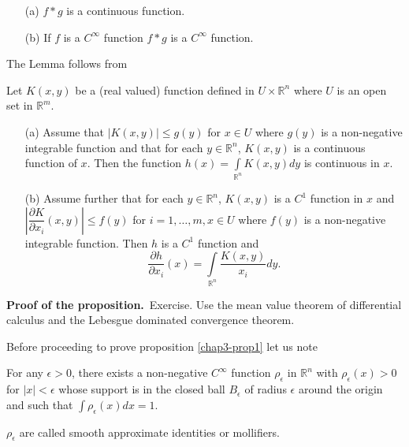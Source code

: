 \begin{lemma}\label{chap3-lem2}
\begin{itemize}
\item[\rm(a)] $f\ast g$ is a continuous function.

\item[\rm(b)] If $f$ is a $C^{\infty}$ function $f\ast g$ is a $C^{\infty}$ function.
\end{itemize}
\end{lemma}

The Lemma follows from

\begin{proposition}\label{chap3-prop2}
Let $K(x,y)$ be a (real valued) function defined in $U\times \mathbb{R}^{n}$ where $U$ is an open set in $\mathbb{R}^{m}$.
\begin{itemize}
\item[\rm(a)] Assume that $|K(x,y)|\leq g(y)$ for $x\in U$ where $g(y)$ is a non-negative integrable function and that for each $y\in \mathbb{R}^{n}$, $K(x,y)$ is a continuous function of $x$. Then the function $h(x)=\int\limits_{\mathbb{R}^{n}}K(x,y)dy$ is continuous in $x$.

\item[\rm(b)] Assume further that for each $y\in \mathbb{R}^{n}$, $K(x,y)$ is a $C^{1}$ function in $x$ and $\left|\dfrac{\partial K}{\partial x_{i}}(x,y)\right|\leq f(y)$ for $i=1,\ldots,m,x\in U$ where $f(y)$ is a non-negative integrable function. Then $h$ is a $C^{1}$ function and
$$
\frac{\partial h}{\partial x_{i}}(x)=\int\limits_{\mathbb{R}^{n}}\frac{K(x,y)}{x_{i}}dy.
$$
\end{itemize}
\end{proposition}

\noindent
{\bf Proof of the proposition.}~Exercise. Use the mean value theorem of differential calculus and the Lebesgue dominated convergence theorem.

Before proceeding to prove proposition \ref{chap3-prop1} let us note

\begin{lemma}\label{chap3-lem3}
For any $\epsilon > 0$, there exists a non-negative $C^{\infty}$ function $\rho_{\epsilon}$ in $\mathbb{R}^{n}$ with $\rho_{\epsilon}(x)>0$ for $|x|<\epsilon$ whose support is in the closed ball $B_{\epsilon}$ of radius $\epsilon$ around the origin and such that $\int \rho_{\epsilon}(x)dx=1$.
\end{lemma}

\begin{remark*}
$\rho_{\epsilon}$ are called smooth approximate identities or mollifiers.
\end{remark*}

